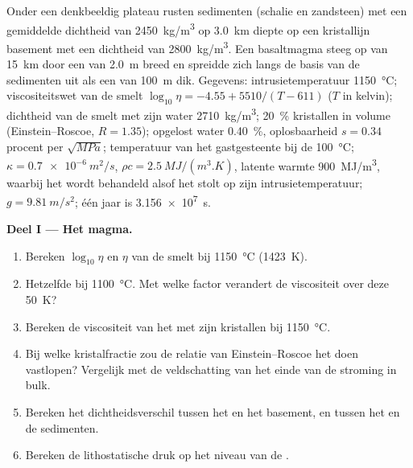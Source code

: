 \begin{problem}
\label{pb:b2:magma-emplacement:1}
Onder een denkbeeldig plateau rusten sedimenten (schalie en zandsteen) met een gemiddelde dichtheid van
\qty{2450}{kg/m^3} op \qty{3.0}{km} diepte op een kristallijn basement met een
dichtheid van \qty{2800}{kg/m^3}. Een basaltmagma steeg op van \qty{15}{km} door een 
van \qty{2.0}{m} breed en spreidde zich langs de basis van de sedimenten uit als een 
van \qty{100}{m} dik. Gegevens: intrusietemperatuur \qty{1150}{\celsius};
viscositeitswet van de smelt $\log_{10}\eta = -4.55 + 5510/(T - 611)$ ($T$ in kelvin);
dichtheid van de smelt met zijn water \qty{2710}{kg/m^3}; \qty{20}{\percent} kristallen in volume
(Einstein--Roscoe, $R = 1.35$); opgelost water \qty{0.40}{\percent}, oplosbaarheid
$s = 0.34$ procent per $\sqrt{\unit{MPa}}$; temperatuur van het gastgesteente bij de 
\qty{100}{\celsius}; $\kappa = \qty{0.7e-6}{m^2/s}$, $\rho c = \qty{2.5}{MJ/(m^3.K)}$,
latente warmte \qty{900}{MJ/m^3}, waarbij het  wordt behandeld alsof het stolt op zijn
intrusietemperatuur; $g = \qty{9.81}{m/s^2}$; één jaar is \qty{3.156e7}{s}.

\medskip\noindent\textbf{Deel I --- Het magma.}
\begin{enumerate}
\item Bereken $\log_{10}\eta$ en $\eta$ van de smelt bij \qty{1150}{\celsius}
(\qty{1423}{K}).
\item Hetzelfde bij \qty{1100}{\celsius}. Met welke factor verandert de viscositeit over
deze \qty{50}{K}?
\item Bereken de viscositeit van het  met zijn kristallen bij
\qty{1150}{\celsius}.
\item Bij welke kristalfractie zou de relatie van Einstein--Roscoe het
 doen vastlopen? Vergelijk met de veldschatting van het einde van de stroming in bulk.
\item Bereken het dichtheidsverschil tussen het  en het basement, en
tussen het  en de sedimenten.
\item Bereken de lithostatische druk op het niveau van de .
\end{enumerate}


\end{problem}
